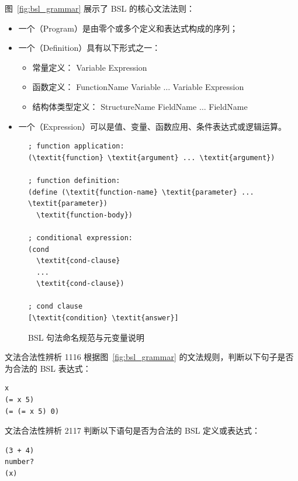 图~\ref{fig:bsl_grammar} 展示了 BSL 的核心文法法则：
\begin{itemize}
  \item 一个（Program）是由零个或多个定义和表达式构成的序列；
  \item 一个（Definition）具有以下形式之一：
    \begin{itemize}
      \item 常量定义： Variable \code{ } Expression\code{)}
      \item 函数定义： FunctionName Variable $\dots$ Variable\code{) } Expression\code{)}
      \item 结构体类型定义： StructureName \code{[} FieldName $\dots$ FieldName\code{])}
    \end{itemize}
  \item 一个（Expression）可以是值、变量、函数应用、条件表达式或逻辑运算。
\end{itemize}

\begin{figure}[htbp]
  \centering
\begin{stepperbox}[unbreakable]
\begin{Verbatim}[commandchars=\\\{\}, fontsize=\footnotesize]
; function application:
(\textit{function} \textit{argument} ... \textit{argument})

; function definition:
(define (\textit{function-name} \textit{parameter} ... \textit{parameter})
  \textit{function-body})

; conditional expression:
(cond
  \textit{cond-clause}
  ...
  \textit{cond-clause})

; cond clause
[\textit{condition} \textit{answer}]
\end{Verbatim}
\end{stepperbox}
  \caption{BSL 句法命名规范与元变量说明}
  \label{fig:bsl_naming_conventions}
\end{figure}

\begin{exercise}{文法合法性辨析 1}{116}
根据图~\ref{fig:bsl_grammar} 的文法规则，判断以下句子是否为合法的 BSL 表达式：
\begin{lstlisting}[language=BSL]
x
(= x 5)
(= (= x 5) 0)
\end{lstlisting}
\end{exercise}

\begin{exercise}{文法合法性辨析 2}{117}
判断以下语句是否为合法的 BSL 定义或表达式：
\begin{lstlisting}[language=BSL]
(3 + 4)
number?
(x)
\end{lstlisting}
\end{exercise}

